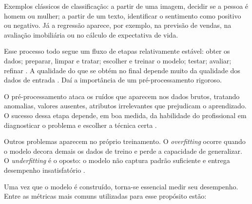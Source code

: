 Exemplos clássicos de classificação: a partir de uma imagem, decidir se a pessoa é homem ou mulher; a partir de um texto, identificar o sentimento como positivo ou negativo. Já a regressão aparece, por exemplo, na previsão de vendas, na avaliação imobiliária ou no cálculo de expectativa de vida.

Esse processo todo segue um fluxo de etapas relativamente estável: obter os dados; preparar, limpar e tratar; escolher e treinar o modelo; testar; avaliar; refinar \cite{tan2006}. A qualidade do que se obtém no final depende muito da qualidade dos dados de entrada \cite{guimaraes2019}. Daí a importância de um pré-processamento rigoroso.

O pré-processamento ataca os ruídos que aparecem nos dados brutos, tratando anomalias, valores ausentes, atributos irrelevantes que prejudicam o aprendizado. O sucesso dessa etapa depende, em boa medida, da habilidade do profissional em diagnosticar o problema e escolher a técnica certa \cite{neves2003}.

Outros problemas aparecem no próprio treinamento. O \textit{overfitting} ocorre quando o modelo decora demais os dados de treino e perde a capacidade de generalizar. O \textit{underfitting} é o oposto: o modelo não captura padrão suficiente e entrega desempenho insatisfatório \cite{russel2010}.

Uma vez que o modelo é construído, torna-se essencial medir seu desempenho. Entre as métricas mais comuns utilizadas para esse propósito estão:

